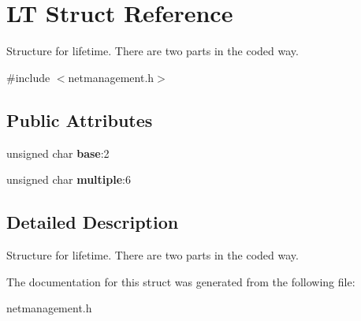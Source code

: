 \hypertarget{structLT}{\section{\-L\-T \-Struct \-Reference}
\label{structLT}
}


\-Structure for lifetime. \-There are two parts in the coded way.  




{\ttfamily \#include $<$netmanagement.\-h$>$}

\subsection*{\-Public \-Attributes}
\begin{DoxyCompactItemize}
\item 
\hypertarget{structLT_a9a183542c64c0b0f611b39b39f9d820e}{unsigned char {\bfseries base}\-:2}\label{structLT_a9a183542c64c0b0f611b39b39f9d820e}

\item 
\hypertarget{structLT_a2e97e845dc4e8a327e1d603d69cb0663}{unsigned char {\bfseries multiple}\-:6}\label{structLT_a2e97e845dc4e8a327e1d603d69cb0663}

\end{DoxyCompactItemize}


\subsection{\-Detailed \-Description}
\-Structure for lifetime. \-There are two parts in the coded way. 

\-The documentation for this struct was generated from the following file\-:\begin{DoxyCompactItemize}
\item 
netmanagement.\-h\end{DoxyCompactItemize}
